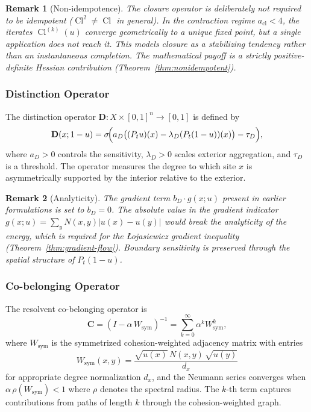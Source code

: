 \documentclass[lettersize,journal]{IEEEtran}
\newtheorem{remark}{Remark}
\DeclareMathOperator{\Cl}{Cl}
\begin{document}
\begin{remark}[Non-idempotence]
The closure operator is deliberately \emph{not} required to be idempotent ($\Cl^2 \neq \Cl$ in general). In the contraction regime $a_{\mathrm{cl}} < 4$, the iterates $\Cl^{(k)}(u)$ converge geometrically to a unique fixed point, but a single application does not reach it. This models closure as a \emph{stabilizing tendency} rather than an instantaneous completion. The mathematical payoff is a strictly positive-definite Hessian contribution (Theorem~\ref{thm:nonidempotent}).
\end{remark}

\subsubsection{Distinction Operator}

The distinction operator $\mathbf{D} : X \times [0,1]^n \to [0,1]$ is defined by
\begin{equation}
\label{eq:distinction}
\mathbf{D}(x; 1-u) = \sigma\!\Bigl(a_D\bigl((P_t u)(x) - \lambda_D (P_t(1-u))(x)\bigr) - \tau_D\Bigr),
\end{equation}
where $a_D > 0$ controls the sensitivity, $\lambda_D > 0$ scales exterior aggregation, and $\tau_D$ is a threshold. The operator measures the degree to which site $x$ is asymmetrically supported by the interior relative to the exterior.

\begin{remark}[Analyticity]
The gradient term $b_D \cdot g(x;u)$ present in earlier formulations is set to $b_D = 0$. The absolute value in the gradient indicator $g(x;u) = \sum_y N(x,y)|u(x) - u(y)|$ would break the analyticity of the energy, which is required for the \L{}ojasiewicz gradient inequality (Theorem~\ref{thm:gradient-flow}). Boundary sensitivity is preserved through the spatial structure of $P_t(1-u)$.
\end{remark}

\subsubsection{Co-belonging Operator}

The resolvent co-belonging operator is
\begin{equation}
\label{eq:cobelong}
\mathbf{C} = (I - \alpha\, W_{\mathrm{sym}})^{-1} = \sum_{k=0}^{\infty} \alpha^k W_{\mathrm{sym}}^k,
\end{equation}
where $W_{\mathrm{sym}}$ is the symmetrized cohesion-weighted adjacency matrix with entries
\begin{equation}
W_{\mathrm{sym}}(x,y) = \frac{\sqrt{u(x)}\, N(x,y)\, \sqrt{u(y)}}{d_x}
\end{equation}
for appropriate degree normalization $d_x$, and the Neumann series converges when $\alpha\,\rho(W_{\mathrm{sym}}) < 1$ where $\rho$ denotes the spectral radius. The $k$-th term captures contributions from paths of length $k$ through the cohesion-weighted graph.
\end{document}
